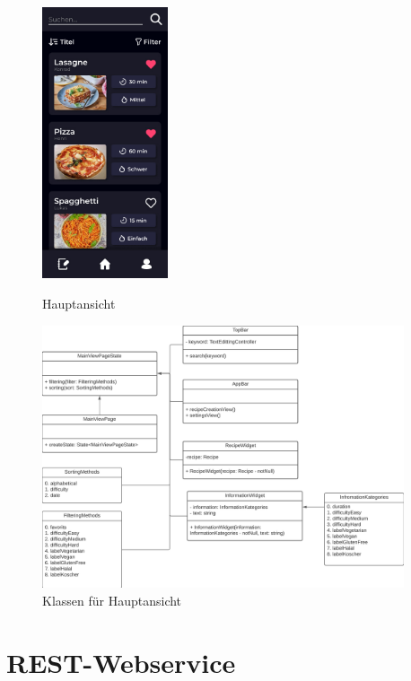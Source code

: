 \documentclass[parskip=full]{scrartcl}
\begin{document}
    \begin{figure}[htp]
    \begin{minipage}
        [t]{0.49\textwidth}
        \centering
        \includegraphics[height=80mm]{images/Presentation-layer/MainView.jpg}
        \caption{Hauptansicht}
        \end{minipage}
    \begin{minipage}
        [t]{0.49\textwidth}
        \centering
        \includegraphics[width=0.95\textwidth]{images/Presentation-layer/MainViewClass.png}
        \caption{Klassen für Hauptansicht}
    \end{minipage}
\end{figure}

\newpage

\section{REST-Webservice}
\end{document}
